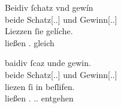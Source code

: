 \begin{exe}
\ex\label{ex:papstkoenig2}
\begin{xlist}
	\ex \label{ex:papstkoenig2_1}
		\gll Beidiv ſchatz vnd gewín \\
			beide Schatz[\Acc.\Sg.\MascI] und Gewinn[\Acc.\Sg.\MascI] \\
	\sn \gll Liezzen ſie gelíche. \\
			ließen \Tpl\subM.\Nom{} gleich \\
		\begin{taggedline}{\parencite[\pno~29vb,38]{kc:VB}}
		\trans {}
		\end{taggedline}

	\ex \label{ex:papstkoenig2_2}
		\gll baidiv ſcaz unde gewin. \\
			beide Schatz[\Acc.\Sg.\MascI] und Gewinn[\Acc.\Sg.\MascI] \\
	\sn \gll liezen ſi in beſlifen. \\
			ließen \Tpl\subM.\Nom{} \Refl.\Dat.\Pl\subM{} entgehen \\
		\begin{taggedline}{\parencites[\pno~26rb,40--41]{kc:A1}[vgl.]%
			[\pno~36ra,40--41]{kc:H}%
			[6112--6113]{schroeder1895}}
		\trans {}
		\end{taggedline}
\end{xlist}
\end{exe}



